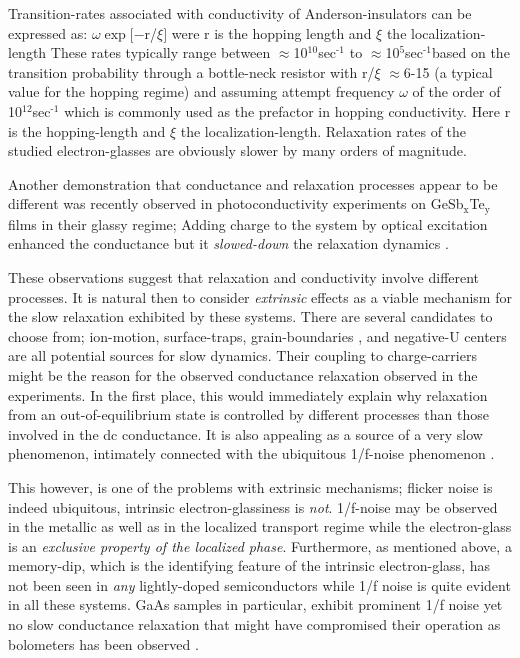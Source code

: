 \documentclass
[preprint,showpacs,byrevtex,10pt,twocolumn,tightenlines,prl,letterpaper]{revtex4}%
\begin{document}
Transition-rates associated with conductivity of Anderson-insulators can be
expressed as: $\omega\exp[-$r/$\xi]$ were r is the hopping length and $\xi$
the localization-length These rates typically range between $\approx
$10$^{\text{10}}$sec$^{\text{-1}}$ to $\approx$10$^{\text{5}}$sec$^{\text{-1
}}$based on the transition probability through a bottle-neck resistor with
r/$\xi$ $\approx$6-15 (a typical value for the hopping regime) and assuming
attempt frequency $\omega$ of the order of 10$^{\text{12}}$sec$^{\text{-1}}$
which is commonly used as the prefactor in hopping conductivity. Here r is the
hopping-length and $\xi$ the localization-length. Relaxation rates of the
studied electron-glasses are obviously slower by many orders of magnitude.

Another demonstration that conductance and relaxation processes appear to be
different was recently observed in photoconductivity experiments on
GeSb$_{\text{x}}$Te$_{\text{y}}$ films in their glassy regime; Adding charge
to the system by optical excitation enhanced the conductance but it
\textit{slowed-down} the relaxation dynamics \cite{32}.

These observations suggest that relaxation and conductivity involve different
processes. It is natural then to consider \textit{extrinsic} effects as a
viable mechanism for the slow relaxation exhibited by these systems. There are
several candidates to choose from; ion-motion, surface-traps, grain-boundaries
\cite{33}, and negative-U centers \cite{34} are all potential sources for slow
dynamics. Their coupling to charge-carriers might be the reason for the
observed conductance relaxation observed in the experiments. In the first
place, this would immediately explain why relaxation from an
out-of-equilibrium state is controlled by different processes than those
involved in the dc conductance. It is also appealing as a source of a very
slow phenomenon, intimately connected with the ubiquitous 1/f-noise phenomenon
\cite{35}.

This however, is one of the problems with extrinsic mechanisms; flicker noise
is indeed ubiquitous, intrinsic electron-glassiness is \textit{not}. 1/f-noise
may be observed in the metallic as well as in the localized transport regime
while the electron-glass is an \textit{exclusive property of the localized
phase}. Furthermore, as mentioned above, a memory-dip, which is the
identifying feature of the intrinsic electron-glass, has not been seen in
\textit{any} lightly-doped semiconductors while 1/f noise is quite evident in
all these systems. GaAs samples in particular, exhibit prominent 1/f noise yet
no slow conductance relaxation that might have compromised their operation as
bolometers has been observed \cite{36}.
\end{document}
